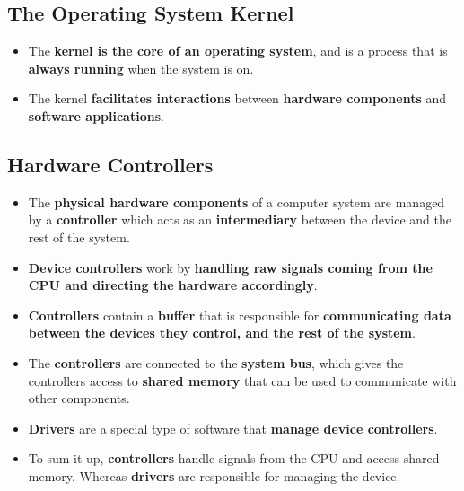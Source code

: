 \documentclass[16pt]{article}
\begin{document}
    \subsection*{The Operating System Kernel}
    \begin{itemize}
        \item The \textbf{kernel is the core of an operating system}, and is a process that is \textbf{always running} when the system is on.
        \item The kernel \textbf{facilitates interactions} between \textbf{hardware components} and \textbf{software applications}.
    \end{itemize}

    \subsection*{Hardware Controllers}
    \begin{itemize}
        \item The \textbf{physical hardware components} of a computer system are managed by a \textbf{controller} which acts as an \textbf{intermediary} between the device and the rest of the system. 
        \item \textbf{Device controllers} work by \textbf{handling raw signals coming from the CPU and directing the hardware accordingly}.
        \item \textbf{Controllers} contain a \textbf{buffer} that is responsible for \textbf{communicating data between the devices they control, and the rest of the system}.
        \item The \textbf{controllers} are connected to the \textbf{system bus}, which gives the controllers access to \textbf{shared memory} that can be used to communicate with other components.
        \item \textbf{Drivers} are a special type of software that \textbf{manage device controllers}.
        \item To sum it up, \textbf{controllers} handle signals from the CPU and access shared memory. Whereas \textbf{drivers} are responsible for managing the device.
    \end{itemize}

\section*{}
\end{document}
